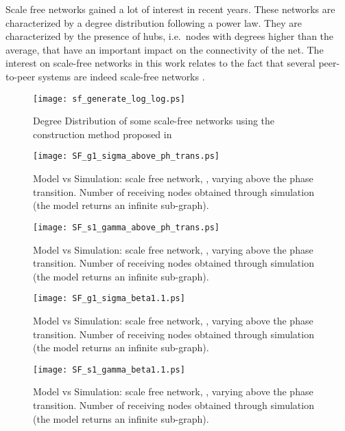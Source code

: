 \documentclass[10pt, conference, compsocconf]{IEEEtran}
\begin{document}
Scale free networks gained a lot of interest in recent years. These networks are characterized by a degree distribution following a power law. 
They are characterized by the presence of hubs, i.e.~nodes with degrees higher than the average, that have an important impact on the connectivity of the net.
The interest on scale-free networks in this work relates to the fact that several peer-to-peer systems are indeed scale-free networks \cite{simutools,newman03thestructure}.

\begin{figure}
   \centering
   \texttt{[image: sf\_generate\_log\_log.ps]}
   \caption{Degree Distribution of some scale-free networks using the construction method proposed in \cite{Aiello00arandom}}
   \label{fig:fig_rete_Aiello}
\end{figure}

\begin{figure}[t]
   \centering
   \texttt{[image: SF\_g1\_sigma\_above\_ph\_trans.ps]}
   \caption{Model vs Simulation: scale free network, , varying  above the phase transition. Number of receiving nodes obtained through simulation (the model returns an infinite sub-graph).}
   \label{fig:SF_confronto_g_above}
\end{figure}

\begin{figure}[t]
   \centering
   \texttt{[image: SF\_s1\_gamma\_above\_ph\_trans.ps]}
   \caption{Model vs Simulation: scale free network, , varying  above the phase transition. Number of receiving nodes obtained through simulation (the model returns an infinite sub-graph).}
   \label{fig:SF_confronto_s_above}
\end{figure}

\begin{figure}[t]
   \centering
   \texttt{[image: SF\_g1\_sigma\_beta1.1.ps]}
   \caption{Model vs Simulation: scale free network, , varying  above the phase transition. Number of receiving nodes obtained through simulation (the model returns an infinite sub-graph).}
   \label{fig:SF_confronto_g_beta1.1}
\end{figure}

\begin{figure}[t]
   \centering
   \texttt{[image: SF\_s1\_gamma\_beta1.1.ps]}
   \caption{Model vs Simulation: scale free network, , varying  above the phase transition. Number of receiving nodes obtained through simulation (the model returns an infinite sub-graph).}
   \label{fig:SF_confronto_s_beta1.1}
\end{figure}
\end{document}
